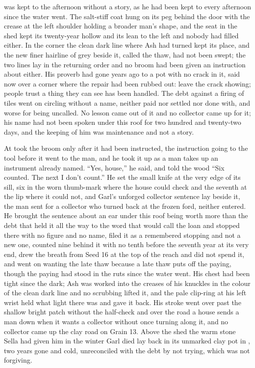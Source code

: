  was kept to the afternoon without a story, as he had been kept to every afternoon since the water went. The salt-stiff coat hung on its peg behind the door with the crease at the left shoulder holding a broader man's shape, and the seat in the shed kept its twenty-year hollow and its lean to the left and nobody had filled either. In the corner the clean dark line where Ash had turned kept its place, and the new finer hairline of grey beside it, called the thaw, had not been swept; the two lines lay in the returning order and no broom had been given an instruction about either. His proverb had gone years ago to a pot with no crack in it, said now over a corner where the repair had been rubbed out: leave the crack showing; people trust a thing they can see has been handled. The debt against a firing of tiles went on circling without a name, neither paid nor settled nor done with, and worse for being uncalled. No lesson came out of it and no collector came up  for it; his name had not been spoken under this roof for two hundred and twenty-two days, and the keeping of him was maintenance and not a story.

At   took the broom only after it had been instructed, the instruction going to the tool before it went to the man, and he took it up as a man takes up an instrument already named. “Yes, house,” he said, and told the wood “Six counted. The next I don't count.” He set the small knife at the very edge of its sill, six in the worn thumb-mark where the house could check and the seventh at the lip where it could not, and Garl's unforged collector sentence lay beside it, the man sent for a collector who turned back at the frozen ford, neither entered. He brought the sentence about an ear under this roof being worth more than the debt that held it all the way to the word that would call the loan and stopped there with no figure and no name, filed it as a remembered stopping and not a new one, counted nine behind it with no tenth before the seventh year at its very end, drew the breath from Seed 16 at the top of the reach and did not spend it, and went on wanting the late thaw because a late thaw puts off the paying, though the paying had stood in the ruts since the water went. His chest had been tight since the dark; Ash was worked into the creases of his knuckles in the colour of the clean dark line and no scrubbing lifted it, and the pale clip-ring at his left wrist held what light there was and gave it back. His stroke went over  past the shallow bright patch without the half-check and over the road a house sends a man down when it wants a collector without once turning along it, and no collector came up the clay road on Grain 13. Above the shed the warm stone Sella had given him in the winter Garl died lay back in its unmarked clay pot in , two years gone and cold, unreconciled with the debt by not trying, which was not forgiving.

